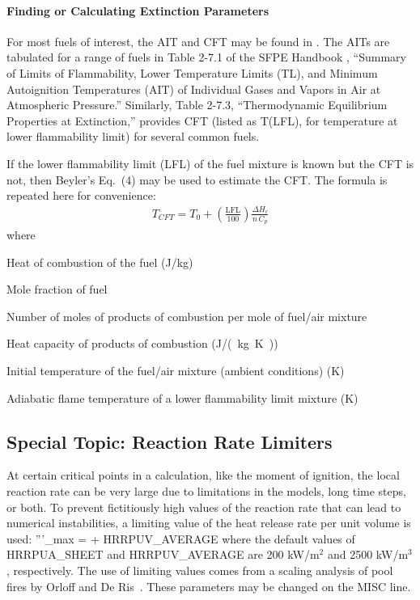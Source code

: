\documentclass[11pt]{book}
\begin{document}
\paragraph{Finding or Calculating Extinction Parameters}

For most fuels of interest, the AIT and CFT may be found in \cite{SFPE:Beyler}.  The AITs are tabulated for a range of fuels in Table 2-7.1 of the SFPE Handbook \cite{SFPE}, ``Summary of Limits of Flammability, Lower Temperature Limits (TL), and Minimum Autoignition Temperatures (AIT) of Individual Gases and Vapors in Air at Atmospheric Pressure.''  Similarly, Table 2-7.3, ``Thermodynamic Equilibrium Properties at Extinction,'' provides CFT (listed as T(LFL), for temperature at lower flammability limit) for several common fuels.

If the lower flammability limit (LFL) of the fuel mixture is known but the CFT is not, then Beyler's Eq.~(4) may be used to estimate the CFT.  The formula is repeated here for convenience:
\begin{align}
T_{\si{CFT}} = T_0 + \left(\frac{\mbox{LFL}}{100}\right) \frac{\Delta H_c}{n \, C_{\si{p}}}
\end{align}
where
\begin{itemize}
{\setlength\itemindent{50pt} \item[$\Delta H_c = $] Heat of combustion of the fuel (\si{J/kg})}
{\setlength\itemindent{50pt} \item[$\mbox{LFL/100} = $] Mole fraction of fuel}
{\setlength\itemindent{50pt} \item[$n = $] Number of moles of products of combustion per mole of fuel/air mixture}
{\setlength\itemindent{50pt} \item[$C_{\si{p}} = $] Heat capacity of products of combustion (\si{J/(kg.K)})}
{\setlength\itemindent{50pt} \item[$T_0 = $] Initial temperature of the fuel/air mixture (ambient conditions) (K)}
{\setlength\itemindent{50pt} \item[$T_{\si{CFT}} = $] Adiabatic flame temperature of a lower flammability limit mixture (K)}
\end{itemize}


\subsection{Special Topic: Reaction Rate Limiters}
\label{info:REAC_Limiters}

At certain critical points in a calculation, like the moment of ignition, the local reaction rate can be very large due to limitations in the models, long time
steps, or both. To prevent fictitiously high values of the reaction rate that can lead to numerical instabilities, a limiting value of the heat release rate
per unit volume is used:
\be
   \dq'''_{\si{max}} =  + \hbox{\ct HRRPUV\_AVERAGE}
\ee
where the default values of {\ct HRRPUA\_SHEET} and {\ct HRRPUV\_AVERAGE} are 200 kW/m$^2$ and 2500 kW/m$^3$, respectively. The use of limiting values comes from a scaling analysis of pool fires by Orloff and De Ris~\cite{Orloff:19th_Symposium}.  These parameters may be changed on the {\ct MISC} line.
\end{document}
